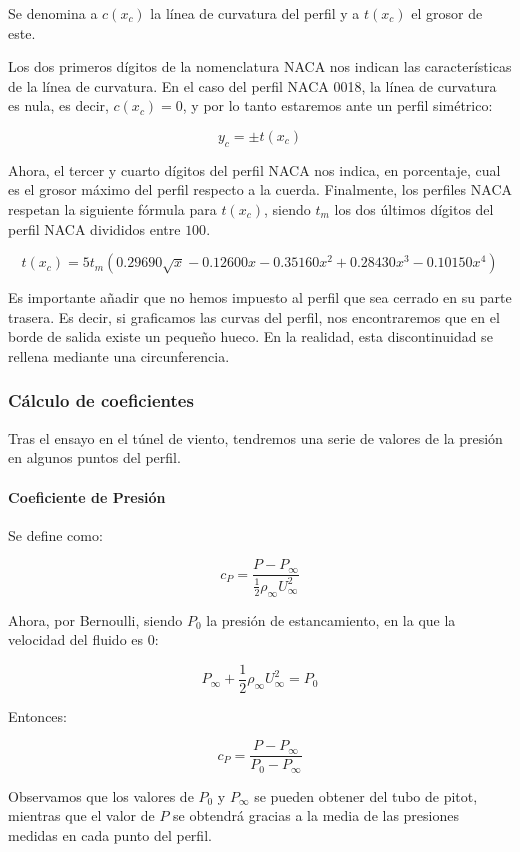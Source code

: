 \documentclass{article}
\begin{document}
Se denomina a $c(x_c)$ la línea de curvatura del perfil y a $t(x_c)$ el grosor de este. 

Los dos primeros dígitos de la nomenclatura NACA nos indican las características de la línea de curvatura. En el caso del perfil
NACA 0018, la línea de curvatura es nula, es decir, $c(x_c) = 0$, y por lo tanto estaremos ante un perfil simétrico:

$$y_c = \pm t(x_c)$$

Ahora, el tercer y cuarto dígitos del perfil NACA nos indica, en porcentaje, cual es el grosor máximo del perfil respecto
a la cuerda. Finalmente, los perfiles NACA respetan la siguiente fórmula para $t(x_c)$, siendo $t_m$ los
dos últimos dígitos del perfil NACA divididos entre $100$.

$$t(x_c) = 5 t_m (0.29690 \sqrt{x} - 0.12600 x - 0.35160 x^2 + 0.28430 x^3 - 0.10150 x^4)$$

Es importante añadir que no hemos impuesto al perfil que sea cerrado en su parte trasera. 
Es decir, si graficamos las curvas del perfil, nos encontraremos que en el borde de salida existe un pequeño hueco. 
En la realidad, esta discontinuidad se rellena mediante una circunferencia. \cite{Jacobs1932TheCO}

\subsubsection{Cálculo de coeficientes}

Tras el ensayo en el túnel de viento, tendremos una serie de valores de la presión en algunos puntos del perfil.

\paragraph{Coeficiente de Presión}

Se define como:

$$c_P = \frac{P - P_{\infty}}{\frac{1}{2}\rho_{\infty} U^2_{\infty}}$$

Ahora, por Bernoulli, siendo $P_0$ la presión de estancamiento, en la que la velocidad del fluido es 0:

$$P_{\infty} + \frac{1}{2} \rho_{\infty} U^2_{\infty} = P_0$$

Entonces:

$$c_P = \frac{P - P_{\infty}}{P_0 - P_{\infty}}$$

Observamos que los valores de $P_0$ y $P_{\infty}$ se pueden obtener del tubo de pitot, mientras que el valor de
$P$ se obtendrá gracias a la media de las presiones medidas en cada punto del perfil.
\end{document}
